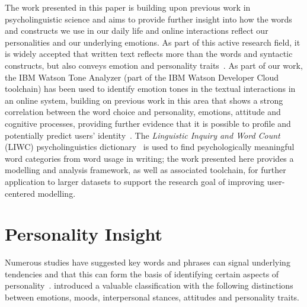 \documentclass[graybox]{svmult}
\begin{document}
The work presented in this paper is building upon previous work in
psycholinguistic science and aims to provide further insight into how
the words and constructs we use in our daily life and online
interactions reflect our personalities and our underlying emotions. As
part of this active research field, it is widely accepted that written
text reflects more than the words and syntactic constructs, but also
conveys emotion and personality
traits~\citep{pennebaker+king:1999}. As part of our work, the IBM
Watson Tone Analyzer (part of the IBM Watson Developer Cloud
toolchain) has been used to identify emotion tones in the textual
interactions in an online system, building on previous work in this
area that shows a strong correlation between the word choice and
personality, emotions, attitude and cognitive processes, providing
further evidence that it is possible to profile and potentially
predict users’ identity~\citep{fast+funder:2008}. The
{\emph{Linguistic Inquiry and Word Count}} (LIWC) psycholinguistics
dictionary~\citep{pennebaker-et-al:2001,tausczik+pennebaker:2010} is
used to find psychologically meaningful word categories from word
usage in writing; the work presented here provides a modelling and
analysis framework, as well as associated toolchain, for further
application to larger datasets to support the research goal of
improving user-centered modelling.



\section{Personality Insight}\label{personality}

Numerous studies have suggested key words and phrases can signal
underlying tendencies and that this can form the basis of identifying
certain aspects of
personality~\citep{iacobelli-et-al:2011,pennebaker+king:1999,oberlander+gill:2004,oberlander+gill:2006}.
\citet{scherer:1984} introduced a valuable classification with the
following distinctions between emotions, moods, interpersonal stances,
attitudes and personality traits.
\end{document}
